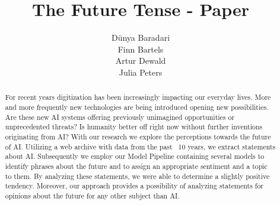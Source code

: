 \documentclass[11pt]{article}
\title{The Future Tense - Paper}
\author{Dünya Baradari\\\And
  Finn Bartels \\\And
  Artur Dewald \\\And
  Julia Peters}
\begin{document}
\maketitle
\begin{abstract}
For recent years digitization has been increasingly impacting our everyday lives.
More and more frequently new technologies are being introduced opening new possibilities.
Are these new AI systems offering previously unimagined opportunities or unprecedented threats?
Is humanity better off right now without further inventions originating from AI?
With our research we explore  the perceptions towards the future of AI.
Utilizing a web archive with data from the past ~10 years, we extract statements about AI. Subsequently we employ our Model Pipeline containing several models to identify phrases about the future and to assign an appropriate sentiment and a topic to them.
By analyzing these statements, we were able to determine a slightly positive tendency.
Moreover, our approach provides a possibility of analyzing statements for opinions about the future for any other subject than AI.

\end{abstract}

\graphicspath{
              {./figures/}
             }









\onecolumn
\appendix



\end{document}
